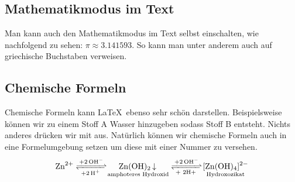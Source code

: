 \subsection{Mathematikmodus im Text}
\label{sec:textmathe}
Man kann auch den Mathematikmodus im Text selbst einschalten, wie nachfolgend zu sehen: $\pi \approx 3.141593$. So kann man unter anderem auch auf griechische Buchstaben verweisen.

\subsection{Chemische Formeln}
Chemische Formeln kann \LaTeX~ebenso sehr schön darstellen. Beispielsweise können wir zu einem Stoff A Wasser hinzugeben sodass Stoff B entsteht. Nichts anderes drücken wir mit  aus. Natürlich können wir chemische Formeln auch in eine Formelumgebung setzen um diese mit einer Nummer zu versehen.
\begin{equation}
	\ce{Zn^2+ <=>[\ce{+ 2OH-}][\ce{+ 2H+}]$\underset{\text{amphoteres Hydroxid}}{\ce{Zn(OH)2 v}}$ <=>C[+2OH-][{+ 2H+}]$\underset{\text{Hydroxozikat}}{\ce{[Zn(OH)4]^2-}}$}
\end{equation}
\cleardoublepage